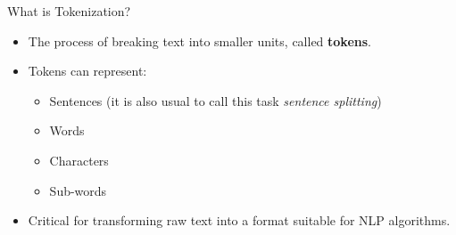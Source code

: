 \documentclass{beamer}
\begin{document}
\begin{frame}{What is Tokenization?}
    \begin{itemize}
        \item The process of breaking text into smaller units, called \textbf{tokens}.
        \item Tokens can represent:
        \begin{itemize}
            \item Sentences (it is also usual to call this task \textit{sentence splitting})
            \item Words
            \item Characters
            \item Sub-words
        \end{itemize}
        \item Critical for transforming raw text into a format suitable for NLP algorithms.
    \end{itemize}
\end{frame}
\end{document}
